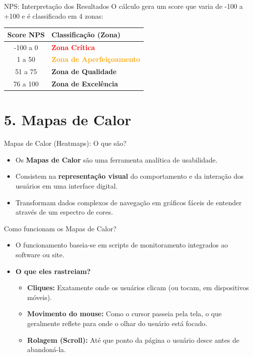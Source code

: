 \documentclass[aspectratio=169]{beamer}
\begin{document}
\begin{frame}{NPS: Interpretação dos Resultados}
    O cálculo gera um score que varia de -100 a +100 e é classificado em 4 zonas:
    \vspace{0.3cm}
    \begin{center}
        \renewcommand{\arraystretch}{1.3}
        \begin{tabular}{c | l}
            \hline
            \textbf{Score NPS} & \textbf{Classificação (Zona)} \\
            \hline
            -100 a 0 & \textcolor{red}{\textbf{Zona Crítica}} \\
            1 a 50 & \textcolor{orange}{\textbf{Zona de Aperfeiçoamento}} \\
            51 a 75 & \textcolor{meuverde}{\textbf{Zona de Qualidade}} \\
            76 a 100 & \textcolor{meuazul}{\textbf{Zona de Excelência}} \\
            \hline
        \end{tabular}
    \end{center}
\end{frame}

\section{5. Mapas de Calor}

\begin{frame}{Mapas de Calor (Heatmaps): O que são?}
    \begin{itemize}
        \item Os \textbf{Mapas de Calor} são uma ferramenta analítica de usabilidade.
        \item Consistem na \textbf{representação visual} do comportamento e da interação dos usuários em uma interface digital.
        \item Transformam dados complexos de navegação em gráficos fáceis de entender através de um espectro de cores.
    \end{itemize}
\end{frame}

\begin{frame}{Como funcionam os Mapas de Calor?}
    \begin{itemize}
        \item O funcionamento baseia-se em scripts de monitoramento integrados ao software ou site.
        \item \textbf{O que eles rastreiam?}
        \begin{itemize}
            \item \textbf{Cliques:} Exatamente onde os usuários clicam (ou tocam, em dispositivos móveis).
            \item \textbf{Movimento do mouse:} Como o cursor passeia pela tela, o que geralmente reflete para onde o olhar do usuário está focado.
            \item \textbf{Rolagem (Scroll):} Até que ponto da página o usuário desce antes de abandoná-la.
        \end{itemize}
    \end{itemize}
\end{frame}
\end{document}
